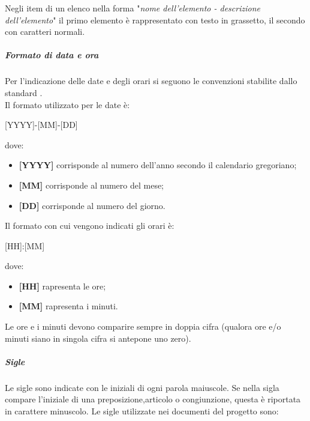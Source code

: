 Negli item di un elenco nella forma "\textit{nome dell'elemento - descrizione dell'elemento}"  il primo elemento è rappresentato con testo in grassetto, il secondo con caratteri normali.
\subparagraph{Formato di data e ora}
Per l'indicazione delle date e degli orari si seguono le convenzioni stabilite dallo standard . \\
Il formato utilizzato per le date è:
\begin{center}
    [YYYY]-[MM]-[DD]
\end{center}
    dove:
    \begin{itemize}
        \item \textbf{[YYYY]} corrisponde al numero dell'anno secondo il calendario gregoriano;
        \item \textbf{[MM]} corrisponde al numero del mese;
        \item \textbf{[DD]} corrisponde al numero del giorno.
    \end{itemize}
Il formato con cui vengono indicati gli orari è:
\begin{center}
    [HH]:[MM]
\end{center} 
dove:
\begin{itemize}
    \item \textbf{[HH]} rapresenta le ore;
    \item \textbf{[MM]} rapresenta i minuti.
\end{itemize}
Le ore e i minuti devono comparire sempre in doppia cifra (qualora ore e/o minuti siano in singola cifra si antepone uno zero). 
\subparagraph{Sigle}
Le sigle sono indicate con le iniziali di ogni parola maiuscole. Se nella sigla compare l'iniziale di una preposizione,articolo o congiunzione, questa è riportata in carattere minuscolo.
Le sigle utilizzate nei documenti del progetto sono:
